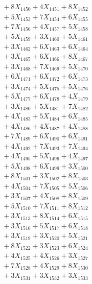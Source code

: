 \documentclass[a4paper,10pt]{article}
\begin{document}
{\begin{align}
&\;  + 8 X_{1450} + 4 X_{1451} + 8 X_{1452} \\[0.3ex]
&\;  + 5 X_{1453} + 7 X_{1454} + 6 X_{1455} \\[0.3ex]
&\;  + 7 X_{1456} + 4 X_{1457} + 5 X_{1458} \\[0.3ex]
&\;  + 5 X_{1459} + 3 X_{1460} + 5 X_{1461} \\[0.3ex]
&\;  + 3 X_{1462} + 6 X_{1463} + 6 X_{1464} \\[0.3ex]
&\;  + 3 X_{1465} + 6 X_{1466} + 8 X_{1467} \\[0.3ex]
&\;  + 3 X_{1468} + 7 X_{1469} + 5 X_{1470} \\[0.3ex]
&\;  + 6 X_{1471} + 6 X_{1472} + 6 X_{1473} \\[0.3ex]
&\;  + 3 X_{1474} + 5 X_{1475} + 5 X_{1476} \\[0.3ex]
&\;  + 5 X_{1477} + 6 X_{1478} + 4 X_{1479} \\[0.5ex]\allowbreak
&\;  + 3 X_{1480} + 5 X_{1481} + 7 X_{1482} \\[0.3ex]
&\;  + 4 X_{1483} + 5 X_{1484} + 6 X_{1485} \\[0.3ex]
&\;  + 4 X_{1486} + 4 X_{1487} + 4 X_{1488} \\[0.3ex]
&\;  + 7 X_{1489} + 6 X_{1490} + 6 X_{1491} \\[0.3ex]
&\;  + 4 X_{1492} + 7 X_{1493} + 7 X_{1494} \\[0.3ex]
&\;  + 4 X_{1495} + 5 X_{1496} + 4 X_{1497} \\[0.3ex]
&\;  + 5 X_{1498} + 6 X_{1499} + 3 X_{1500} \\[0.3ex]
&\;  + 8 X_{1501} + 3 X_{1502} + 8 X_{1503} \\[0.3ex]
&\;  + 4 X_{1504} + 7 X_{1505} + 5 X_{1506} \\[0.3ex]
&\;  + 3 X_{1507} + 4 X_{1508} + 8 X_{1509} \\[0.5ex]\allowbreak
&\;  + 5 X_{1510} + 7 X_{1511} + 8 X_{1512} \\[0.3ex]
&\;  + 3 X_{1513} + 8 X_{1514} + 6 X_{1515} \\[0.3ex]
&\;  + 3 X_{1516} + 5 X_{1517} + 6 X_{1518} \\[0.3ex]
&\;  + 3 X_{1519} + 3 X_{1520} + 5 X_{1521} \\[0.3ex]
&\;  + 8 X_{1522} + 3 X_{1523} + 6 X_{1524} \\[0.3ex]
&\;  + 4 X_{1525} + 4 X_{1526} + 3 X_{1527} \\[0.3ex]
&\;  + 7 X_{1528} + 4 X_{1529} + 8 X_{1530} \\[0.3ex]
&\;  + 3 X_{1531} + 3 X_{1532} + 3 X_{1533} \\[0.3ex]

\end{align}}
\end{document}
